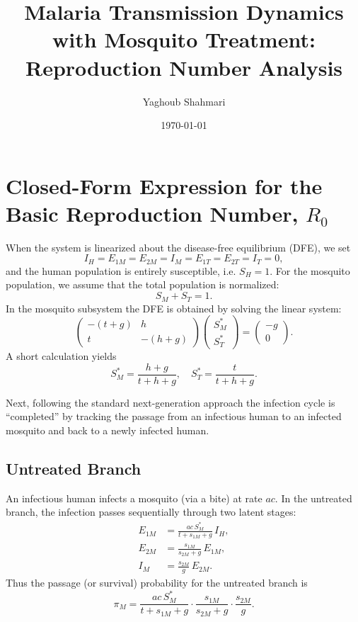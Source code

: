\documentclass{article}
\title{Malaria Transmission Dynamics with Mosquito Treatment: Reproduction Number Analysis}
\author{Yaghoub Shahmari}
\date{\today}
\begin{document}
\maketitle

\section{Closed-Form Expression for the Basic Reproduction Number, \(R_0\)}

When the system is linearized about the disease-free equilibrium (DFE), we set 
\[
I_H=E_{1M}=E_{2M}=I_M=E_{1T}=E_{2T}=I_T=0,
\]
and the human population is entirely susceptible, i.e. \(S_H=1\). For the mosquito population, we assume that the total population is normalized:
\[
S_M+S_T=1.
\]
In the mosquito subsystem the DFE is obtained by solving the linear system:
\[
\begin{pmatrix}
-(t+g)& h\\[1mm]
t & -(h+g)
\end{pmatrix}
\begin{pmatrix}
S_M^*\\[1mm]
S_T^*
\end{pmatrix}
=
\begin{pmatrix}
- g\\[1mm]
0
\end{pmatrix}.
\]
A short calculation yields
\[
S_M^*=\frac{h+g}{t+h+g},\quad
S_T^*=\frac{t}{t+h+g}.
\]

Next, following the standard next-generation approach the infection cycle is “completed” by tracking the passage from an infectious human to an infected mosquito and back to a newly infected human.

\subsection*{Untreated Branch}
An infectious human infects a mosquito (via a bite) at rate \(ac\). In the untreated branch, the infection passes sequentially through two latent stages:
\[
\begin{aligned}
E_{1M}&=\frac{ac\,S_M^*}{t+s_{1M}+g}\,I_H,\\[1mm]
E_{2M}&=\frac{s_{1M}}{s_{2M}+g}\,E_{1M},\\[1mm]
I_M&=\frac{s_{2M}}{g}\,E_{2M}.
\end{aligned}
\]
Thus the passage (or survival) probability for the untreated branch is
\[
\pi_M=\frac{ac\,S_M^*}{t+s_{1M}+g}\cdot\frac{s_{1M}}{s_{2M}+g}\cdot\frac{s_{2M}}{g}.
\]
\end{document}
